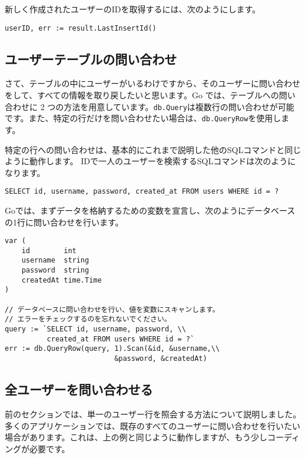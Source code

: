 新しく作成されたユーザーのIDを取得するには、次のようにします。


\begin{lstlisting}[numbers=none]
userID, err := result.LastInsertId()
\end{lstlisting}


\subsection{ユーザーテーブルの問い合わせ}

さて、テーブルの中にユーザーがいるわけですから、そのユーザーに問い合わせをして、すべての情報を取り戻したいと思います。Go では、テーブルへの問い合わせに 2 つの方法を用意しています。\texttt{db.Query}は複数行の問い合わせが可能です。また、特定の行だけを問い合わせたい場合は、\texttt{db.QueryRow}を使用します。

特定の行への問い合わせは、基本的にこれまで説明した他のSQLコマンドと同じように動作します。
IDで一人のユーザーを検索するSQLコマンドは次のようになります。


\begin{lstlisting}[numbers=none]
SELECT id, username, password, created_at FROM users WHERE id = ?
\end{lstlisting}

Goでは、まずデータを格納するための変数を宣言し、次のようにデータベースの1行に問い合わせを行います。


\begin{lstlisting}[numbers=none]
var (
    id        int
    username  string
    password  string
    createdAt time.Time
)

// データベースに問い合わせを行い、値を変数にスキャンします。
// エラーをチェックするのを忘れないでください。
query := `SELECT id, username, password, \\
          created_at FROM users WHERE id = ?`
err := db.QueryRow(query, 1).Scan(&id, &username,\\
                          &password, &createdAt)
\end{lstlisting}



\subsection{全ユーザーを問い合わせる}

前のセクションでは、単一のユーザー行を照会する方法について説明しました。多くのアプリケーションでは、既存のすべてのユーザーに問い合わせを行いたい場合があります。これは、上の例と同じように動作しますが、もう少しコーディングが必要です。

